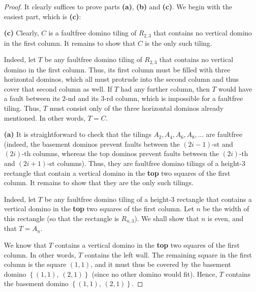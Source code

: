 \begin{proof}
It
clearly suffices to prove parts \textbf{(a)}, \textbf{(b)} and \textbf{(c)}.
We begin with the easiest part, which is \textbf{(c)}: \medskip

\textbf{(c)} Clearly, $C$ is a faultfree domino tiling of $R_{2,3}$ that
contains no vertical domino in the first column. It remains to show that $C$
is the only such tiling.

Indeed, let $T$ be any faultfree domino tiling of $R_{2,3}$ that contains no
vertical domino in the first column. Thus, its first column must be filled
with three horizontal dominos, which all must protrude into the second column
and thus cover that second column as well. If $T$ had any further column, then
$T$ would have a fault between its $2$-nd and its $3$-rd column, which is
impossible for a faultfree tiling. Thus, $T$ must consist only of the three
horizontal dominos already mentioned. In other words, $T=C$. \medskip

\textbf{(a)} It is straightforward to check that the tilings $A_{2}%
,A_{4},A_{6},A_{8},\ldots$ are faultfree (indeed, the basement dominos prevent
faults between the $\left(  2i-1\right)  $-st and $\left(  2i\right)  $-th
columns, whereas the top dominos prevent faults between the $\left(
2i\right)  $-th and $\left(  2i+1\right)  $-st columns). Thus, they are
faultfree domino tilings of a height-$3$ rectangle that contain a vertical
domino in the \textbf{top} two squares of the first column. It remains to show
that they are the only such tilings.

Indeed, let $T$ be any faultfree domino tiling of a height-$3$ rectangle that
contains a vertical domino in the \textbf{top} two squares of the first
column. Let $n$ be the width of this rectangle (so that the rectangle is
$R_{n,3}$). We shall show that $n$ is even, and that $T=A_{n}$.

We know that $T$ contains a vertical domino in the \textbf{top} two squares of
the first column. In other words, $T$ contains the left wall. The remaining square in the first column is the square $\left(
1,1\right)  $, and it must thus be covered by the basement domino $\left\{
\left(  1,1\right)  ,\ \left(  2,1\right)  \right\}  $ (since no other domino
would fit). Hence, $T$ contains the basement domino $\left\{  \left(
1,1\right)  ,\ \left(  2,1\right)  \right\}  $.


\end{proof}
